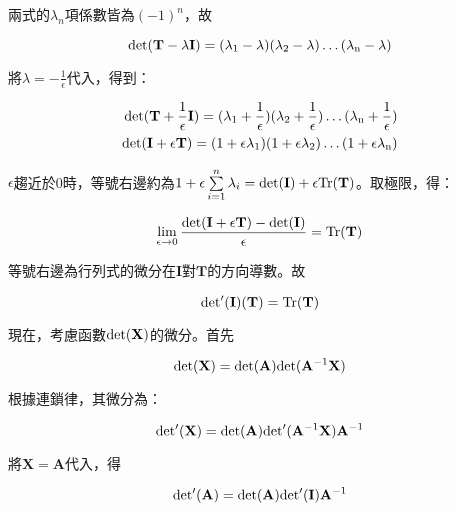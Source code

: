 \documentclass{article}
\begin{document}
兩式的$\lambda_n$項係數皆為$(-1)^n$，故

\begin{equation}
\rm det(\mathbf T-\lambda\mathbf I)=(\lambda_1 - \lambda)(\lambda_2 - \lambda)\ldots(\lambda_n - \lambda)
\end{equation}

將$\lambda=-\frac{1}{\epsilon}$代入，得到：

\begin{equation}
\begin{aligned}
\rm det(\mathbf T+\frac{1}{\epsilon}\mathbf I)=(\lambda_1+\frac{1}{\epsilon})(\lambda_2+\frac{1}{\epsilon})\ldots(\lambda_n+\frac{1}{\epsilon})\\
\rm det(\mathbf I+\epsilon\mathbf T)=(1+\epsilon\lambda_1)(1+\epsilon\lambda_2)\ldots(1+\epsilon\lambda_n)
\end{aligned}
\end{equation}

$\epsilon$趨近於0時，等號右邊約為$1+\epsilon\sum\limits_{i=1}^n\lambda_i=\rm det(\mathbf I)+\epsilon\rm Tr(\mathbf T)$。取極限，得：

\begin{equation}
\lim_{\epsilon \to 0}\frac{\rm det(\mathbf I+\epsilon\mathbf T)-\rm det(\mathbf I)}{\epsilon}  = \rm Tr(\mathbf T)
\end{equation}

等號右邊為行列式的微分在$\mathbf I$對$\mathbf T$的方向導數。故

\begin{equation}
\rm det'(\mathbf I)(\mathbf T)=\rm Tr(\mathbf T)
\end{equation}

現在，考慮函數$\rm det(\mathbf X)$的微分。首先

\begin{equation}
\rm det(\mathbf X) = \rm det(\mathbf A)\rm det(\mathbf A^{-1}\mathbf X)
\end{equation}

根據連鎖律，其微分為：

\begin{equation}
\rm det'(\mathbf X) = \rm det(\mathbf A)\rm det'(\mathbf A^{-1}\mathbf X)\mathbf A^{-1}
\end{equation}

將$\mathbf X=\mathbf A$代入，得

\begin{equation}
\rm det'(\mathbf A)=\rm det(\mathbf A)\rm det'(\mathbf I)\mathbf A^{-1}
\end{equation}
\end{document}
